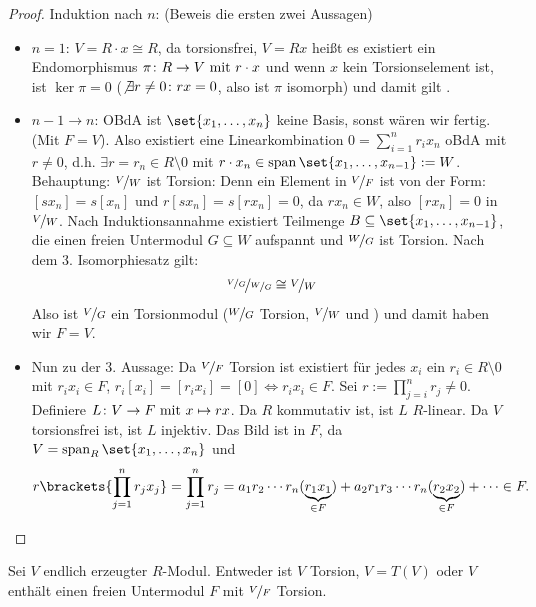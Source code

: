 \begin{proof}
	Induktion nach $n$: (Beweis die ersten zwei Aussagen)
	\begin{itemize}
		\item $n=1$: $V = R\cdot x \cong R$, da torsionsfrei, $V = Rx$ heißt es existiert ein Endomorphismus $\pi\colon R \to V \mit r \cdot x$ und wenn $x$ kein Torsionselement ist, ist $\ker \pi = 0$ ($\not \exists r \neq 0 \colon rx = 0$, also ist $\pi$ isomorph) und damit gilt .
		\item $n-1 \to n$: OBdA ist $\set{x_1, \dots, x_n}$ keine Basis, sonst wären wir fertig. (Mit $F = V$). Also existiert eine Linearkombination $0 = \sum_{i=1}^n r_i x_n$ oBdA mit $r \neq 0$, d.h. $\exists r = r_n \in R \setminus{0}$ mit $r\cdot x_n \in \Span\set{x_1, \dots, x_{n-1}} := W$.\\
		Behauptung: $\lnkset{V}{W}$ ist Torsion: Denn ein Element in $\lnkset{V}{F}$ ist von der Form: $[s x_n] = s[x_n]$ und $r[s x_n] = s[r x_n] = 0$, da $r x_n \in W$, also $[r x_n] = 0$ in $\lnkset{V}{W}$. Nach Induktionsannahme existiert Teilmenge $B \subseteq \set{x_1, \dots, x_{n-1}}$, die einen freien Untermodul $G \subseteq W$ aufspannt und $\lnkset{W}{G}$ ist Torsion. Nach dem 3. Isomorphiesatz gilt:
		\begin{align*}
			\lnkset{\lnkset{V}{G}}{\lnkset{W}{G}} \cong \lnkset{V}{W}
		\end{align*}
		Also ist $\lnkset{V}{G}$ ein Torsionmodul ($\lnkset{W}{G}$ Torsion, $\lnkset{V}{W}$ und ) und damit haben wir $F = V$.
		\item Nun zu der 3. Aussage: Da $\lnkset{V}{F}$ Torsion ist existiert für jedes $x_i$ ein $r_i \in R\setminus{0}$ mit $r_i x_i \in F$, $r_i[x_i] = [r_i x_i] = [0] \Leftrightarrow r_i x_i \in F$. Sei $r := \prod_{j=i}^n r_j \neq 0$. Definiere $L\colon V \to F \mit x \mapsto rx$. Da $R$ kommutativ ist, ist $L$ $R$-linear. Da $V$ torsionsfrei ist, ist $L$ injektiv. Das Bild ist in $F$, da $V = \Span_R\set{x_1, \dots, x_n}$ und
		\begin{align*}
			r\brackets{\prod_{j=1}^n r_j x_j} = \prod_{j=1}^n r_j = a_1 r_2\cdots r_n (\underbrace{r_1 x_1}_{\in F}) + a_2 r_1 r_3 \cdots r_n(\underbrace{r_2 x_2}_{\in F}) + \dots \in F.
		\end{align*}
	\end{itemize}
\end{proof}
\begin{conclusion}
	Sei $V$ endlich erzeugter $R$-Modul. Entweder ist $V$ Torsion, $V = T(V)$ oder $V$ enthält einen freien Untermodul $F$ mit $\lnkset{V}{F}$ Torsion.
\end{conclusion}
